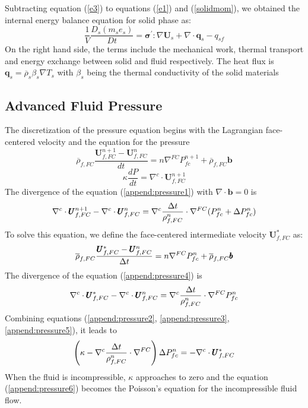 \documentclass[preprint,12pt]{elsarticle}
\begin{document}
%
%
Subtracting equation (\ref{e3}) to equations (\ref{e1}) and (\ref{solidmom}), we obtained the internal energy balance equation for solid phase as:
%
%
\begin{equation}
     \frac{1}{V}\frac{D_s(m_s e_s)}{Dt} = \pmb{\sigma}^\prime:\nabla \pmb{U}_s
    + \nabla \cdot \pmb{q}_s - q_{sf} 
\end {equation}
%
%
On the right hand side, the terms include the mechanical work, thermal transport and energy exchange between solid and fluid respectively. The heat flux is $\pmb{q}_s = \overline{\rho}_s \beta_s \nabla T_s$ with $\beta_s$ being the thermal conductivity of the solid materials
%
%
\subsection{\textsf{Advanced Fluid Pressure}}
The discretization of the pressure equation begins with the Lagrangian face-centered velocity and the equation for the pressure
%
\begin{equation}
 \label{append:pressure1}
  \overline{\rho}_{f,FC} \frac{\pmb{U}_{f,FC}^{n+1} - \pmb{U}_{f,FC}^{n}}{dt} 
  = n \nabla^{FC} P_{fc}^{n+1} + \overline{\rho}_{f,FC} \pmb{b}
\end {equation}
%
%
\begin{equation}
\label{append:pressure2}
  \kappa \frac{dP}{dt} = \nabla^c \cdot \pmb{U}_{f,FC}^{n+1}
\end {equation}
%
The divergence of the equation (\ref{append:pressure1}) with $ \nabla \cdot \pmb{b} = 0$ is
%
\begin{equation}
\label{append:pressure3}
  \nabla^c \cdot \pmb{U}_{f,FC}^{n+1} - \nabla^c \cdot \pmb{U}_{f,FC}^{n}
  = \nabla^c \frac{\Delta{t}}{\rho_{f,FC}^n} \cdot \nabla^{FC} (P_{fc}^{n} + \Delta P_{fc}^{n})
\end {equation}
%
To solve this equation, we define the face-centered intermediate velocity $ \pmb{U}_{f,FC}^{*}$ as:
%
\begin{equation}
 \label{append:pressure4}
  \overline{\rho}_{f,FC} \frac{\pmb{U}_{f,FC}^{*} - \pmb{U}_{f,FC}^{n}}{\Delta{t}} 
  = n \nabla^{FC} P_{fc}^{n} + \overline{\rho}_{f,FC} \pmb{b}
\end {equation}
%
%
The divergence of the equation (\ref{append:pressure4}) is
%
\begin{equation}
\label{append:pressure5}
  \nabla^c \cdot \pmb{U}_{f,FC}^{*} - \nabla^c \cdot \pmb{U}_{f,FC}^{n}
  = \nabla^c \frac{\Delta{t}}{\rho_{f,FC}^n} \cdot \nabla^{FC} P_{fc}^{n}
\end {equation}
%
Combining equations (\ref{append:pressure2}, \ref{append:pressure3}, \ref{append:pressure5}), it leads to
\begin{equation}
\label{append:pressure6}
  \left(  
   \kappa - \nabla^c \frac{\Delta{t}}{\rho_{f,FC}^n} \cdot \nabla^{FC}
  \right) \Delta P_{fc}^{n} = - \nabla^c \cdot \pmb{U}_{f,FC}^{*}
\end {equation}
When the fluid is incompressible, $\kappa$ approaches to zero and the equation (\ref{append:pressure6}) becomes the Poisson's equation for the incompressible fluid flow.
%
%
\end{document}
